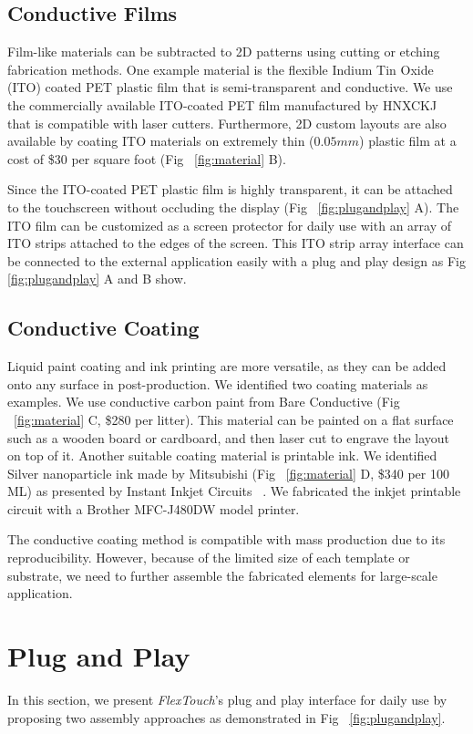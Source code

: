 \subsection{Conductive Films}
Film-like materials can be subtracted to 2D patterns using cutting or etching fabrication methods. One example material is the flexible Indium Tin Oxide (ITO) coated PET plastic film that is semi-transparent and conductive. We use the commercially available ITO-coated PET film manufactured by HNXCKJ ~\cite{ITO} that is compatible with laser cutters. Furthermore, 2D custom layouts are also available by coating ITO materials on extremely thin ($0.05 mm$) plastic film at a cost of \$30 per square foot (Fig ~\ref{fig:material} B).

Since the ITO-coated PET plastic film is highly transparent, it can be attached to the touchscreen without occluding the display (Fig ~\ref{fig:plugandplay} A). The ITO film can be customized as a screen protector for daily use with an array of ITO strips attached to the edges of the screen. This ITO strip array interface can be connected to the external application easily with a plug and play design as Fig \ref{fig:plugandplay} A and B show.

\subsection{Conductive Coating}
Liquid paint coating and ink printing are more versatile, as they can be added onto any surface in post-production. We identified two coating materials as examples. We use conductive carbon paint from Bare Conductive (Fig ~\ref{fig:material} C, \$280 per litter).  This material can be painted on a flat surface such as a wooden board or cardboard, and then laser cut to engrave the layout on top of it. Another suitable coating material is printable ink. We identified Silver nanoparticle ink made by Mitsubishi (Fig ~\ref{fig:material} D, \$340 per 100 ML) as presented by Instant Inkjet Circuits ~\cite{Kawahara-inkjet}. We fabricated the inkjet printable circuit with a Brother MFC-J480DW model printer. 

The conductive coating method is compatible with mass production due to its reproducibility. However, because of the limited size of each template or substrate, we need to further assemble the fabricated elements for large-scale application.

\section{Plug and Play}
In this section, we present \textit{FlexTouch}'s plug and play interface for daily use by proposing two assembly approaches as demonstrated in Fig ~\ref{fig:plugandplay}. 


